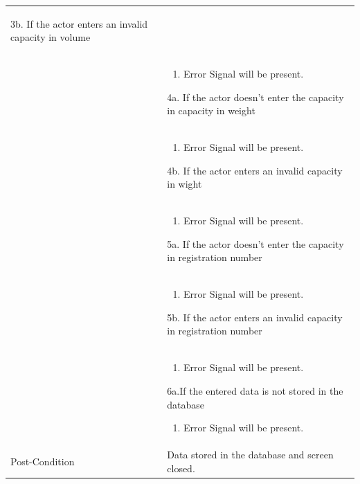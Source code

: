 \documentclass[12pt,a4paper]{article}
\begin{document}
\begin{longtable}{| p{3cm}|p{12cm}|}
\begin{enumerate}
	\end{enumerate}
3b. If the actor enters an invalid capacity in volume \\ 	
&	\begin{enumerate}
		\item Error Signal will be present.
	\end{enumerate}
4a. If the actor doesn't enter the capacity in capacity in weight\\ 	
&	\begin{enumerate}
		\item Error Signal will be present.
	\end{enumerate}
4b. If the actor enters an invalid capacity in wight\\ 	
&	\begin{enumerate}
		\item Error Signal will be present.
	\end{enumerate}
5a. If the actor doesn't enter the capacity in registration number\\ 	
&	\begin{enumerate}
		\item Error Signal will be present.
	\end{enumerate}
5b. If the actor enters an invalid capacity in registration number\\ 	
&	\begin{enumerate}
		\item Error Signal will be present.
	\end{enumerate}
6a.If the entered data is not stored in the database  
	\begin{enumerate}
		\item Error Signal will be present.
	\end{enumerate}
\\ \hline
Post-Condition &  Data stored in the database and screen closed. \\\hline
\end{longtable}
\end{document}

